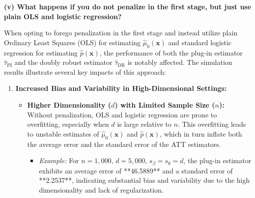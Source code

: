 \documentclass{article}
\begin{document}
\textbf{(v) What happens if you do not penalize in the first stage, but just use plain OLS and logistic regression?}

When opting to forego penalization in the first stage and instead utilize plain Ordinary Least Squares (OLS) for estimating \( \hat{\mu}_0(\mathbf{x}) \) and standard logistic regression for estimating \( \hat{p}(\mathbf{x}) \), the performance of both the plug-in estimator \( \hat{\tau}_{\text{PI}} \) and the doubly robust estimator \( \hat{\tau}_{\text{DR}} \) is notably affected. The simulation results illustrate several key impacts of this approach:

\begin{enumerate}
  \item \textbf{Increased Bias and Variability in High-Dimensional Settings:}
    \begin{itemize}
      \item \textbf{Higher Dimensionality (\( d \)) with Limited Sample Size (\( n \)):} Without penalization, OLS and logistic regression are prone to overfitting, especially when \( d \) is large relative to \( n \). This overfitting leads to unstable estimates of \( \hat{\mu}_0(\mathbf{x}) \) and \( \hat{p}(\mathbf{x}) \), which in turn inflate both the average error and the standard error of the ATT estimators.
        \begin{itemize}
          \item \textit{Example:} For \( n = 1,000 \), \( d = 5,000 \), \( s_\beta = s_\theta = d \), the plug-in estimator exhibits an average error of **46.5889** and a standard error of **2.2537**, indicating substantial bias and variability due to the high dimensionality and lack of regularization.
        \end{itemize}
    \end{itemize}


\end{enumerate}
\end{document}
